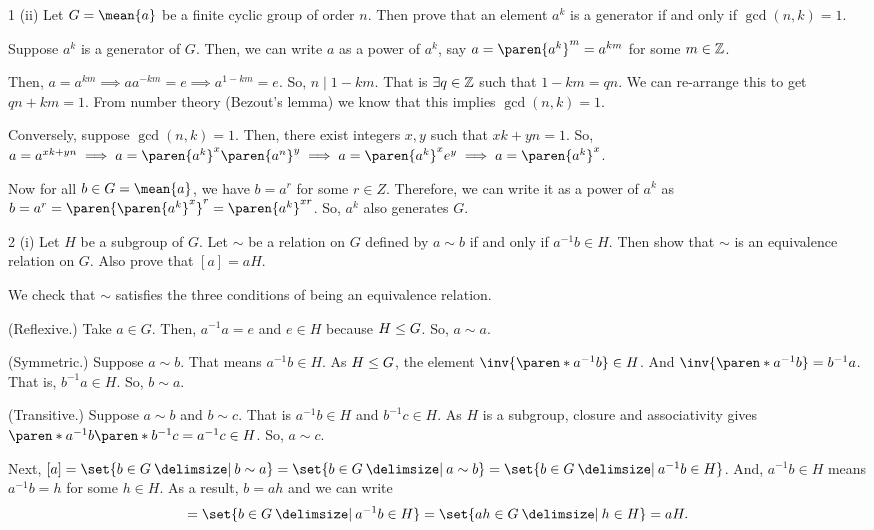 \documentclass[11pt]{penrose}
\let\cyclic\mean
\begin{document}
\begin{problem}{1 (ii)}
    Let $G = \cyclic{a}$ be a finite cyclic group of order $n$. Then prove that an element $a^k$ is a generator if and only if $\gcd(n, k) = 1$.

    \solution Suppose $a^k$ is a generator of $G$. Then, we can write $a$ as a power of $a^k$, say $a = \paren{a^k}^m = a^{km}$ for some $m \in \mathbb{Z}$.

    Then, $a = a^{km} \implies a a^{-km} = e \implies a^{1-km} = e$. So, $n \mid 1 - km$. That is $\exists q \in \mathbb{Z}$ such that $1 - km = qn$. We can re-arrange this to get $qn + km = 1$. From number theory (Bezout's lemma) we know that this implies $\gcd(n,k)=1$.

    Conversely, suppose $\gcd(n,k)=1$. Then, there exist integers $x, y$ such that $xk + yn = 1$. So, $a = a^{xk + yn} \implies a = \paren{a^{k}}^{x} \paren{a^{n}}^{y} \implies a = \paren{a^{k}}^{x} e^{y} \implies a = \paren{a^{k}}^{x}$.

    Now for all $b \in G=\cyclic{a}$, we have $b = a^r$ for some $r \in Z$. Therefore, we can write it as a power of $a^k$ as $b = a^r = \paren{\paren{a^{k}}^{x}}^{r} = \paren{a^{k}}^{xr}$. So, $a^k$ also generates $G$.
\end{problem}

\begin{problem}{2 (i)}
    Let $H$ be a subgroup of $G$. Let $\sim$ be a relation on $G$ defined by $a \sim b$ if and only if $a^{-1} b \in H$. Then show that $\sim$ is an equivalence relation on $G$. Also prove that $[a] = aH$.

    \solution We check that $\sim$ satisfies the three conditions of being an equivalence relation.
    
    (Reflexive.) Take $a \in G$. Then, $a^{-1} a = e$ and $e \in H$ because $H \mathrel{\leq} G$. So, $a \sim a$.

    (Symmetric.) Suppose $a \sim b$. That means $a^{-1} b \in H$. As $H \mathrel{\leq} G$, the element $\inv{\paren*{a^{-1} b}} \in H$. And $\inv{\paren*{a^{-1} b}} = b^{-1} a$. That is, $b^{-1} a \in H$. So, $b \sim a$.

    (Transitive.) Suppose $a \sim b$ and $b \sim c$. That is $a^{-1} b \in H$ and $b^{-1} c \in H$. As $H$ is a subgroup, closure and associativity gives $\paren*{a^{-1} b} \paren*{b^{-1} c} = a^{-1} c \in H$. So, $a \sim c$.

    Next, $[a] = \set{b \in G \st b \sim a} = \set{b \in G \st a \sim b} = \set{b \in G \st a^{-1} b \in H}$. And, $a^{-1} b \in H$ means $a^{-1} b = h$ for some $h \in H$. As a result, $b = ah$ and we can write
    \begin{equation*}
        [a] = \set{b \in G \st a^{-1} b \in H} = \set{ah \in G \st h \in H} = aH.
    \end{equation*}
\end{problem}
\end{document}
